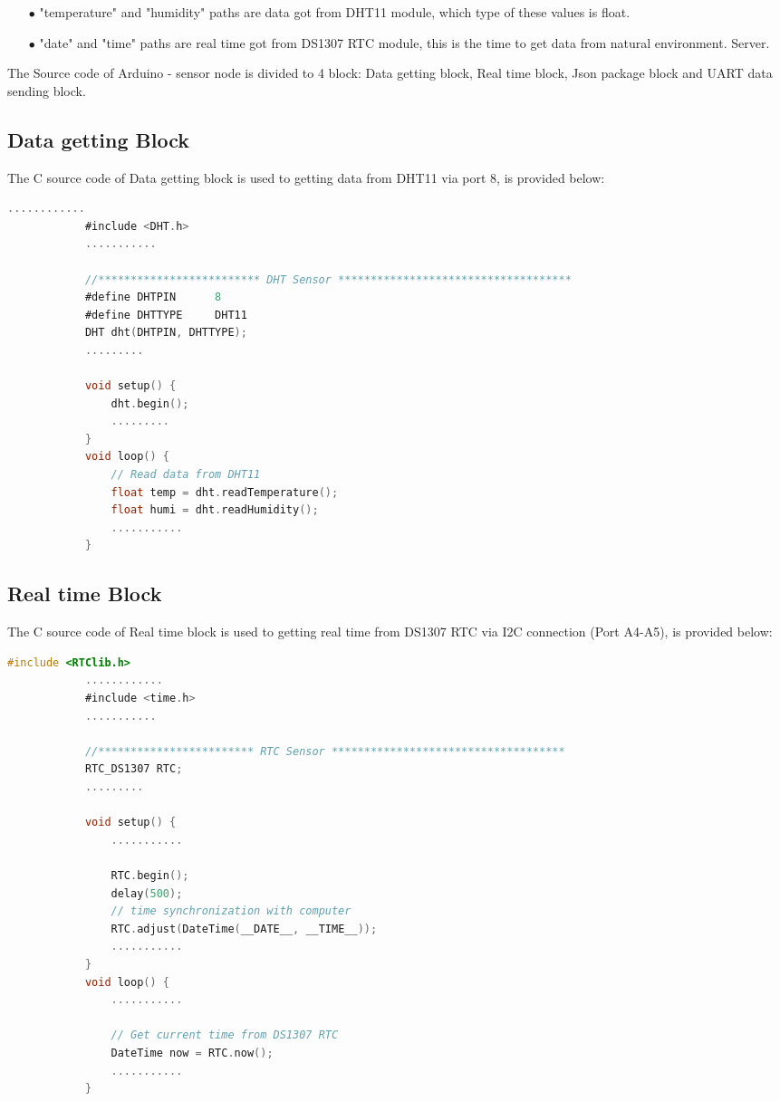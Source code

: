 \documentclass[13pt,a4paper]{article}
\begin{document}
	\begin{enumerate}
		\item[$\bullet$] "temperature" and "humidity" paths are data got from DHT11 module, which type of these values is float.
		\item[$\bullet$] "date" and "time" paths are real time got from DS1307 RTC module, this is the time to get data from natural environment. Server.
	\end{enumerate}
	The Source code of Arduino - sensor node is divided to 4 block: Data getting block, Real time block, Json package block and UART data sending block. \\
		\subsection{Data getting Block}
		The C source code of Data getting block is used to getting data from DHT11 via port 8, is provided below:
		\begin{lstlisting}[language=C, caption= Getting data from DHT11 sensor, label=test_float]
			............
			#include <DHT.h>
			...........
			
			//************************* DHT Sensor ************************************
			#define DHTPIN      8
			#define DHTTYPE     DHT11  
			DHT dht(DHTPIN, DHTTYPE);
			.........
			
			void setup() {
				dht.begin();
				.........
			}
			void loop() {
				// Read data from DHT11
				float temp = dht.readTemperature();
				float humi = dht.readHumidity();
				...........
			}
		\end{lstlisting}
	
		\subsection{Real time Block}
		The C source code of Real time block is used to getting real time from DS1307 RTC via I2C connection (Port A4-A5), is provided below:
		\begin{lstlisting}[language=C, caption= Getting real time from DS1307 RTC, label=test_float]
			#include <RTClib.h>
			............
			#include <time.h>
			...........
			
			//************************ RTC Sensor ************************************
			RTC_DS1307 RTC;
			.........
			
			void setup() {
				...........
				
				RTC.begin();  
				delay(500);
				// time synchronization with computer
				RTC.adjust(DateTime(__DATE__, __TIME__)); 
				...........
			}
			void loop() {
				...........
				
				// Get current time from DS1307 RTC
				DateTime now = RTC.now();
				...........
			}
		\end{lstlisting}
	
\end{document}
